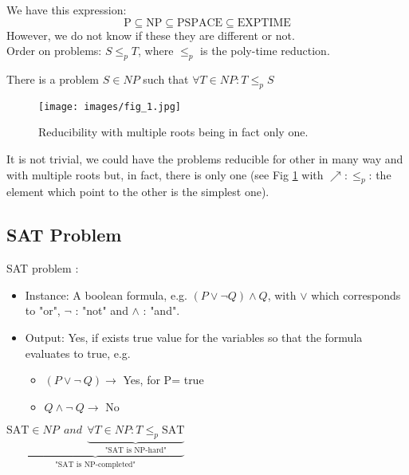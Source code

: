 We have this expression:
$$ \text{P} \subseteq \text{NP} \subseteq \text{PSPACE} \subseteq \text{EXPTIME}$$
However, we do not know if these they are different or not.\\
Order on problems: $S \leq_p T$, where $\leq_p$ is the poly-time reduction.\\

\begin{theorem} 
There is a problem $S \in NP$ such that $\forall T \in NP: T \leq_p S$ 
\end{theorem} 

\begin{figure}[h!]
\centering
\texttt{[image: images/fig\_1.jpg]}
\caption{Reducibility with multiple roots being in fact only one.}
\label{c12:reducibility}
\end{figure}

It is not trivial, we could have the problems reducible for other in many way and
with multiple roots but, in fact, there is only one (see Fig \ref{c12:reducibility} with $\nearrow : \leq_p$: the element which point to the other is the simplest one).

\subsection{SAT Problem}

\begin{definition} SAT problem :
\begin{itemize}
\item Instance: A boolean formula, e.g. $ \left( P \vee \neg Q \right) \wedge Q$, with $\vee$ which corresponds to "or", $\neg$ : "not" and $\wedge$ : "and".
\item Output: Yes, if exists true value for the variables so that the formula evaluates to true, e.g.  \begin{itemize}
\item $\left( P \vee \neg \ Q \right) \rightarrow$ Yes, for P= true
\item $Q \wedge \neg \ Q \rightarrow$ No
\end{itemize}  
\end{itemize}
\end{definition}
\vspace{0.5cm}
\begin{theorem}
$\underbrace{\text{SAT} \in NP \ \ and \ \ \underbrace{\forall T \in NP: T \leq_p \text{SAT}}_{\text{"SAT is NP-hard"}}}_{\text{"SAT is NP-completed"}}$
\end{theorem}

